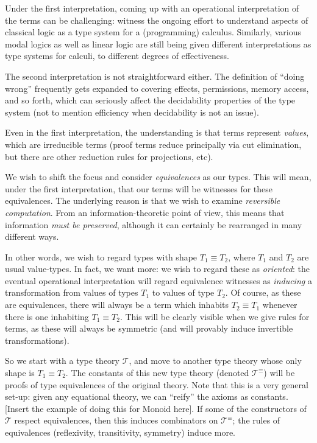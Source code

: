 \documentclass[preprint]{sigplanconf}
\begin{document}
Under the first interpretation, coming up with an operational interpretation
of the terms can be challenging: witness the ongoing effort to understand
aspects of classical logic as a type system for a (programming) calculus.
Similarly, various modal logics as well as linear logic are still being given
different interpretations as type systems for calculi, to different degrees
of effectiveness.

The second interpretation is not straightforward either.  The definition of
``doing wrong'' frequently gets expanded to covering effects, permissions,
memory access, and so forth, which can seriously affect the decidability
properties of the type system (not to mention efficiency when decidability is
not an issue).

Even in the first interpretation, the understanding is that terms represent
\emph{values}, which are irreducible terms (proof terms reduce principally
via cut elimination, but there are other reduction rules for projections,
etc).

We wish to shift the focus and consider \emph{equivalences} as our types.
This will mean, under the first interpretation, that our terms will be
witnesses for these equivalences.  The underlying reason is that we wish to
examine \emph{reversible computation}.  From an information-theoretic point
of view, this means that information \emph{must be preserved}, although it
can certainly be rearranged in many different ways.

In other words, we wish to regard types with shape $T_1\equiv T_2$, where
$T_1$ and $T_2$ are usual value-types.  In fact, we want more: we wish to
regard these as \emph{oriented}: the eventual operational interpretation will
regard equivalence witnesses as \emph{inducing} a transformation from values
of types $T_1$ to values of type $T_2$.  Of course, as these are
equivalences, there will always be a term which inhabits $T_2\equiv T_1$
whenever there is one inhabiting $T_1 \equiv T_2$.  This will be clearly
visible when we give rules for terms, as these will always be symmetric (and
will provably induce invertible transformations).

So we start with a type theory $\mathcal{T}$, and move to another type theory
whose only shape is $T_1\equiv T_2$.  The constants of this new type theory
(denoted $\mathcal{T}^{\equiv}$) will be proofs of type equivalences of the
original theory.  Note that this is a very general set-up: given any
equational theory, we can ``reify'' the axioms as constants.  [Insert the
example of doing this for Monoid here].  If some of the constructors of
$\mathcal{T}$ respect equivalences, then this induces combinators on
$\mathcal{T}^{\equiv}$; the rules of equivalences (reflexivity, transitivity,
symmetry) induce more.
\end{document}
